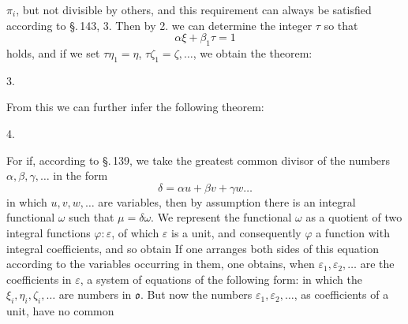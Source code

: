 $\pi_i$, but not divisible by others, and this requirement can always
be satisfied according to \S.\,143, 3. Then by 2. we can determine
the integer $\tau$ so that
\[
\alpha\xi + \beta_1\tau = 1
\]
holds, and if we set $\tau\eta_1 = \eta$, $\tau\zeta_1 = \zeta, \ldots$,
we obtain the theorem:

3. 

From this we can further infer the following theorem:

4. 

For if, according to \S.\,139, we take the greatest common divisor of
the numbers $\alpha, \beta, \gamma, \ldots$ in the form
\[
\delta = \alpha u + \beta v + \gamma w \ldots
\]
in which $u, v, w, \ldots$ are variables, then by assumption there is
an integral functional $\omega$ such that $\mu = \delta \omega$. We
represent the functional $\omega$ as a quotient of two integral
functions $\varphi : \varepsilon$, of which $\varepsilon$ is a unit,
and consequently $\varphi$ a function with integral coefficients, and
so obtain
If one arranges both sides of this equation according to the variables
occurring in them, one obtains, when $\varepsilon_1, \varepsilon_2, \ldots$
are the coefficients in $\varepsilon$, a system of equations of the
following form:
in which the $\xi_i, \eta_i, \zeta_i, \ldots$ are numbers in
$\mathfrak{o}$. But now the numbers $\varepsilon_1, \varepsilon_2, \ldots$,
as coefficients of a unit, have no common
